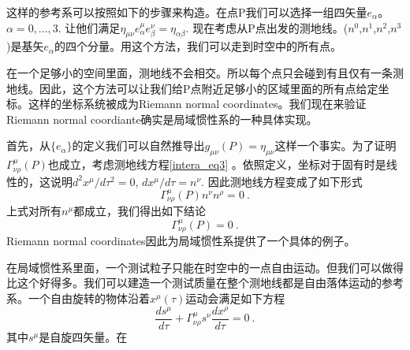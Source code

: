 这样的参考系可以按照如下的步骤来构造。在点P我们可以选择一组四矢量$e_\alpha$。$\alpha = 0,\ldots,3$. 让他们满足$\eta_{\mu\nu}e^\mu_\alpha e^\nu_\beta = \eta_{\alpha\beta}$. 现在考虑从P点出发的测地线。($n^0$,$n^1$,$n^2$,$n^3$)是基矢$e_\alpha$的四个分量。用这个方法，我们可以走到时空中的所有点。

在一个足够小的空间里面，测地线不会相交。所以每个点只会碰到有且仅有一条测地线。因此，这个方法可以让我们给P点附近足够小的区域里面的所有点给定坐标。这样的坐标系统被成为Riemann normal coordinates。我们现在来验证Riemann normal coordiante确实是局域惯性系的一种具体实现。

首先，从$\{e_{\alpha}\}$的定义我们可以自然推导出$g_{\mu\nu}(P) = \eta_{\mu\nu}$这样一个事实。为了证明$\Gamma^\mu_{\nu\rho}(P)$也成立，考虑测地线方程\autoref{intera_eq3} 。依照定义，坐标对于固有时是线性的，这说明$d^2 x^\mu/d \tau^2 = 0$, $dx^\mu/d\tau = n^\nu$. 因此测地线方程变成了如下形式
\begin{equation}
\Gamma^\mu_{\nu\rho} (P) n^\nu n^\rho = 0 ~.
\end{equation}
上式对所有$n^\mu$都成立，我们得出如下结论
\begin{equation}
\Gamma^\mu_{\nu\rho} (P) = 0~.
\end{equation}
Riemann normal coordinates因此为局域惯性系提供了一个具体的例子。

在局域惯性系里面，一个测试粒子只能在时空中的一点自由运动。但我们可以做得比这个好得多。我们可以建造一个测试质量在整个测地线都是自由落体运动的参考系。一个自由旋转的物体沿着$x^\mu(\tau)$运动会满足如下方程
\begin{equation}
\frac{ds^\mu}{d\tau} + \Gamma^\mu_{\nu\rho} s^\nu \frac{dx^\rho}{d\tau} = 0~.
\end{equation}
其中$s^\mu$是自旋四矢量。在





